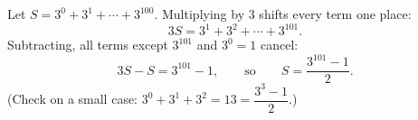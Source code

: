 Let $S=3^0+3^1+\cdots+3^{100}$. Multiplying by $3$ shifts every term one place:
\[3S=3^1+3^2+\cdots+3^{101}.\]
Subtracting, all terms except $3^{101}$ and $3^0=1$ cancel:
\[3S-S=3^{101}-1,\qquad\text{so}\qquad S=\boxed{\dfrac{3^{101}-1}{2}}.\]
(Check on a small case: $3^0+3^1+3^2=13=\dfrac{3^3-1}{2}$.)

